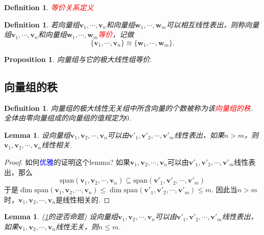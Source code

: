 \documentclass{article}
\newtheorem{lemma}[theorem]{Lemma}
\newtheorem{proposition}[theorem]{Proposition}
\newtheorem{definition}[theorem]{Definition}
\newcommand{\mbf}[1]{\bm{#1}}
\newcommand{\redt}[1]{\textcolor{red}{#1}}
\newcommand{\bluet}[1]{\textcolor{blue}{#1}}
\begin{document}
\begin{definition}
\rm \redt{等价关系定义}
\end{definition}

\begin{definition}
\rm 若向量组$\mbf{v}_1,\cdots,\mbf{v}_n$和向量组$\mbf{w}_1,\cdots,\mbf{w}_m$可以相互线性表出，则称向量组$\mbf{v}_1,\cdots,\mbf{v}_n$和向量组$\mbf{w}_1,\cdots,\mbf{w}_m$\redt{等价}，记做
$$
\{\mbf{v}_1,\cdots,\mbf{v}_n\} \cong \{\mbf{w}_1,\cdots,\mbf{w	}_m\}.
$$
\end{definition}

\begin{proposition}
\rm 向量组与它的极大线性组等价. 
\end{proposition}



\subsection{向量组的秩} 

\begin{definition}
\rm 向量组的极大线性无关组中所含向量的个数被称为该\redt{向量组的秩}. 全体由零向量组成的向量组的值规定为$0$.
\end{definition}

\begin{lemma}\label{vectors-rank: lemma1}
\rm 设向量组$\mbf{v}_1,\mbf{v}_2,\cdots,\mbf{v}_n$可以由$\mbf{v}'_1,\mbf{v}'_2,\cdots,\mbf{v}'_m$线性表出，如果$n > m$，则$\mbf{v}_1,\mbf{v}_2,\cdots,\mbf{v}_n$线性相关.
\end{lemma}

\begin{proof}
如何\bluet{优雅}的证明这个lemma? 如果$\mbf{v}_1,\mbf{v}_2,\cdots,\mbf{v}_n$可以由$\mbf{v}'_1,\mbf{v}'_2,\cdots,\mbf{v}'_m$线性表出，那么
$$
\text{span}(\mbf{v}_1,\mbf{v}_2,\cdots,\mbf{v}_n) \subseteq \text{span}(\mbf{v}'_1,\mbf{v}'_2,\cdots,\mbf{v}'_m)
$$
于是$\dim \text{span}(\mbf{v}_1,\mbf{v}_2,\cdots,\mbf{v}_n) \leq \dim \text{span}(\mbf{v}'_1,\mbf{v}'_2,\cdots,\mbf{v}'_m) \leq m$. 因此当$n > m$时，$\mbf{v}_1,\mbf{v}_2,\cdots,\mbf{v}_n$是线性相关的.
\end{proof}

\begin{lemma}
\rm (\ref{vectors-rank: lemma1}的逆否命题) 设向量组$\mbf{v}_1,\mbf{v}_2,\cdots,\mbf{v}_n$可以由$\mbf{v}'_1,\mbf{v}'_2,\cdots,\mbf{v}'_m$线性表出，如果$\mbf{v}_1,\mbf{v}_2,\cdots,\mbf{v}_n$线性无关，则$n \leq m$.
\end{lemma}
\end{document}
